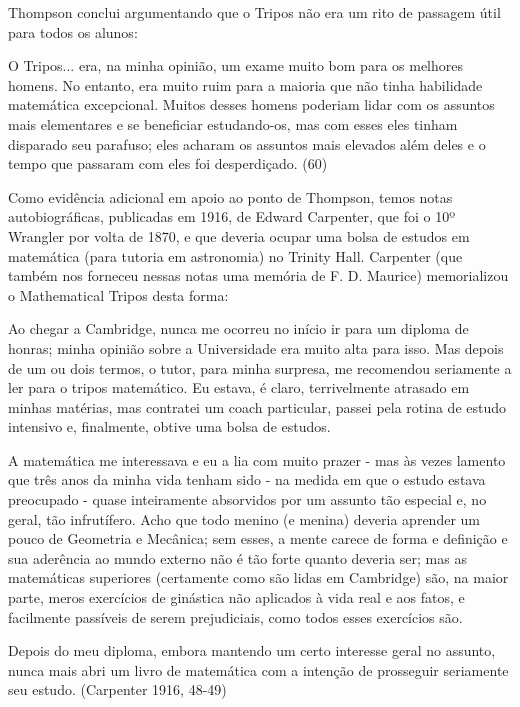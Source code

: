 \documentclass[12pt]{article}
\begin{document}
Thompson conclui argumentando que o Tripos não era um rito de passagem útil para todos os alunos:

O Tripos... era, na minha opinião, um exame muito bom para os melhores homens. No entanto, era muito ruim para a maioria que não tinha habilidade matemática excepcional. Muitos desses homens poderiam lidar com os assuntos mais elementares e se beneficiar estudando-os, mas com esses eles tinham disparado seu parafuso; eles acharam os assuntos mais elevados além deles e o tempo que passaram com eles foi desperdiçado. (60)

Como evidência adicional em apoio ao ponto de Thompson, temos notas autobiográficas, publicadas em 1916, de Edward Carpenter, que foi o 10º Wrangler por volta de 1870, e que deveria ocupar uma bolsa de estudos em matemática (para tutoria em astronomia) no Trinity Hall. Carpenter (que também nos forneceu nessas notas uma memória de F. D. Maurice) memorializou o Mathematical Tripos desta forma:

Ao chegar a Cambridge, nunca me ocorreu no início ir para um diploma de honras; minha opinião sobre a Universidade era muito alta para isso. Mas depois de um ou dois termos, o tutor, para minha surpresa, me recomendou seriamente a ler para o tripos matemático. Eu estava, é claro, terrivelmente atrasado em minhas matérias, mas contratei um coach particular, passei pela rotina de estudo intensivo e, finalmente, obtive uma bolsa de estudos.

A matemática me interessava e eu a lia com muito prazer - mas às vezes lamento que três anos da minha vida tenham sido - na medida em que o estudo estava preocupado - quase inteiramente absorvidos por um assunto tão especial e, no geral, tão infrutífero. Acho que todo menino (e menina) deveria aprender um pouco de Geometria e Mecânica; sem esses, a mente carece de forma e definição e sua aderência ao mundo externo não é tão forte quanto deveria ser; mas as matemáticas superiores (certamente como são lidas em Cambridge) são, na maior parte, meros exercícios de ginástica não aplicados à vida real e aos fatos, e facilmente passíveis de serem prejudiciais, como todos esses exercícios são.

Depois do meu diploma, embora mantendo um certo interesse geral no assunto, nunca mais abri um livro de matemática com a intenção de prosseguir seriamente seu estudo. (Carpenter 1916, 48-49)
\end{document}
